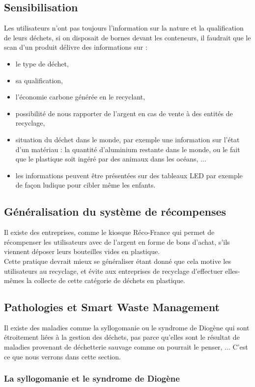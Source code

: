 \documentclass[a4paper,12pt]{report}
\begin{document}
\subsection{Sensibilisation}
Les utilisateurs n'ont pas toujours l'information sur la nature et la qualification de leurs déchets, si on disposait de bornes devant les conteneurs, il faudrait que le scan d'un produit délivre des informations sur :
\begin{itemize}
\item le type de déchet,
\item sa qualification,
\item l'économie carbone générée en le recyclant,
\item possibilité de nous rapporter de l'argent en cas de vente à des entités de recyclage,
\item situation du déchet dans le monde, par exemple une information sur l'état d'un matériau : la quantité d'aluminium restante dans le monde, ou le fait que le plastique soit ingéré par des animaux dans les océans, ...
\item les informations peuvent être présentées sur des tableaux LED par exemple de façon ludique pour cibler même les enfants.

\end{itemize}
\subsection{Généralisation du système de récompenses}
Il existe des entreprises, comme le kiosque Réco-France qui permet de récompenser les utilisateurs avec de l'argent en forme de bons d'achat, s'ils viennent déposer leurs bouteilles vides en plastique.\\ 
Cette pratique devrait mieux se généraliser étant donné que cela motive les utilisateurs au recyclage, et évite aux entreprises de recyclage d'effectuer elles-mêmes la collecte de cette catégorie de déchets en plastique.

\subsection{Pathologies et Smart Waste Management}
Il existe des maladies comme la syllogomanie ou le syndrome de Diogène qui sont étroitement liées à la gestion des déchets, pas parce qu'elles sont le résultat de maladies provenant de déchetterie sauvage comme on pourrait le penser, ... C'est ce que nous verrons dans cette section.

\subsubsection*{La syllogomanie et le syndrome de Diogène}
\end{document}
